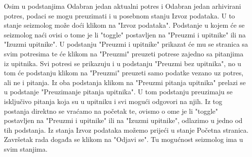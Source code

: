 		Osim u podstanjima Odabran jedan aktualni potres i Odabran jedan arhivirani potres, podaci se mogu preuzimati i u posebnom stanju Izvoz podataka. U to stanje seizmolog može doći klikom na "Izvoz podataka". 
        Podstanje u kojem će se seizmolog naći ovisi o tome je li "toggle" postavljen na "Preuzmi i upitnike" ili na "Izuzmi upitnike". U podstanju "Preuzmi i upitnike" prikazat će mu se stranica sa svim potresima te će klikom na "Preuzmi" preuzeti potrese zajedno sa pitanjima iz upitnika.
        Svi potresi se prikazuju i u podstanju "Preuzmi bez upitnika", no u tom će podstanju klikom na "Preuzmi" preuzeti samo podatke vezano uz potres, ali ne i pitanja. Iz oba podstanja klikom na "Preuzmi pitanja upitnika" prelazi se u podstanje "Preuzimanje pitanja upitnika".
        U tom podstanju preuzimaju se isključivo pitanja koja su u upitniku i svi mogući odgovori na njih. Iz tog postanja direktno se vraćamo na početak te, ovismo o ome je li "toggle" postavljen na "Preuzmi i upitnike" ili na "Izuzmi upitnike", odlazimo u jedno od tih podstanja.
        Iz stanja Izvoz podataka možemo prijeći u stanje Početna stranica.
        Završetak rada događa se klikom na "Odjavi se". Tu mogućnost seizmolog ima u svim stanjima.
			
			
			
